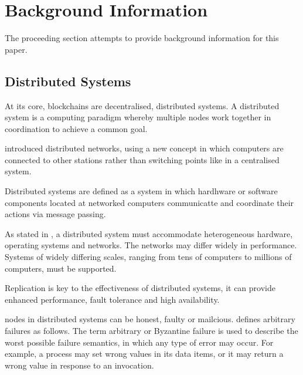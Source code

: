\section{Background Information}
The proceeding section attempts to provide background information for this paper.

\subsection{Distributed Systems}
At its core, blockchains are decentralised, distributed systems.
A distributed system is a computing paradigm whereby multiple nodes work together in coordination to achieve a common goal. \cite{bashir_mastering_2017}

\cite{baran_distributed_1964} introduced distributed networks, using a new concept in which computers are connected to other stations rather than switching points like in a centralised system.

Distributed systems are defined as a system in which hardhware or software components located at networked computers communicatte and coordinate their actions via message passing. \cite{coulouris_distributed_2011}

As stated in \cite{coulouris_distributed_2011}, a distributed system must accommodate heterogeneous hardware, operating systems and networks. The networks may differ widely in performance. Systems of widely differing scales, ranging from tens of computers to millions of computers, must be supported.

Replication is key to the effectiveness of distributed systems, it can provide enhanced performance, fault tolerance and high availability. \cite{coulouris_distributed_2011}

nodes in distributed systems can be honest, faulty or mailcious. \cite{bashir_mastering_2017}
\cite{coulouris_distributed_2011} defines arbitrary failures as follows. The term arbitrary or Byzantine failure is used to describe the worst possible failure semantics, in which any type of error may occur. 
For example, a process may set wrong values in its data items, or it may return a wrong value in response to an invocation.

